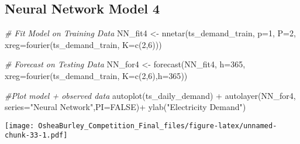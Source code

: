\documentclass[
]{article}
\newenvironment{Shaded}{\begin{snugshade}}{\end{snugshade}}
\newcommand{\AttributeTok}[1]{\textcolor[rgb]{0.77,0.63,0.00}{#1}}
\newcommand{\CommentTok}[1]{\textcolor[rgb]{0.56,0.35,0.01}{\textit{#1}}}
\newcommand{\ConstantTok}[1]{\textcolor[rgb]{0.00,0.00,0.00}{#1}}
\newcommand{\DecValTok}[1]{\textcolor[rgb]{0.00,0.00,0.81}{#1}}
\newcommand{\FunctionTok}[1]{\textcolor[rgb]{0.00,0.00,0.00}{#1}}
\newcommand{\NormalTok}[1]{#1}
\newcommand{\OtherTok}[1]{\textcolor[rgb]{0.56,0.35,0.01}{#1}}
\newcommand{\SpecialCharTok}[1]{\textcolor[rgb]{0.00,0.00,0.00}{#1}}
\newcommand{\StringTok}[1]{\textcolor[rgb]{0.31,0.60,0.02}{#1}}
\begin{document}
\begin{Shaded}
\end{Shaded}

\hypertarget{neural-network-model-4}{%
\subsection{Neural Network Model 4}\label{neural-network-model-4}}

\begin{Shaded}
\begin{Highlighting}[]
\CommentTok{\# Fit Model on Training Data}
\NormalTok{NN\_fit4 }\OtherTok{\textless{}{-}} \FunctionTok{nnetar}\NormalTok{(ts\_demand\_train,}
                 \AttributeTok{p=}\DecValTok{1}\NormalTok{,}
                 \AttributeTok{P=}\DecValTok{2}\NormalTok{,}
                 \AttributeTok{xreg=}\FunctionTok{fourier}\NormalTok{(ts\_demand\_train, }\AttributeTok{K=}\FunctionTok{c}\NormalTok{(}\DecValTok{2}\NormalTok{,}\DecValTok{6}\NormalTok{)))}

\CommentTok{\# Forecast on Testing Data}
\NormalTok{NN\_for4 }\OtherTok{\textless{}{-}} \FunctionTok{forecast}\NormalTok{(NN\_fit4, }
                   \AttributeTok{h=}\DecValTok{365}\NormalTok{,}
                   \AttributeTok{xreg=}\FunctionTok{fourier}\NormalTok{(ts\_demand\_train, }
                                          \AttributeTok{K=}\FunctionTok{c}\NormalTok{(}\DecValTok{2}\NormalTok{,}\DecValTok{6}\NormalTok{),}\AttributeTok{h=}\DecValTok{365}\NormalTok{))}

\CommentTok{\#Plot model + observed data}
\FunctionTok{autoplot}\NormalTok{(ts\_daily\_demand) }\SpecialCharTok{+}
  \FunctionTok{autolayer}\NormalTok{(NN\_for4, }\AttributeTok{series=}\StringTok{"Neural Network"}\NormalTok{,}\AttributeTok{PI=}\ConstantTok{FALSE}\NormalTok{)}\SpecialCharTok{+}
  \FunctionTok{ylab}\NormalTok{(}\StringTok{"Electricity Demand"}\NormalTok{) }
\end{Highlighting}
\end{Shaded}

\texttt{[image: OsheaBurley\_Competition\_Final\_files/figure-latex/unnamed-chunk-33-1.pdf]}
\end{document}
